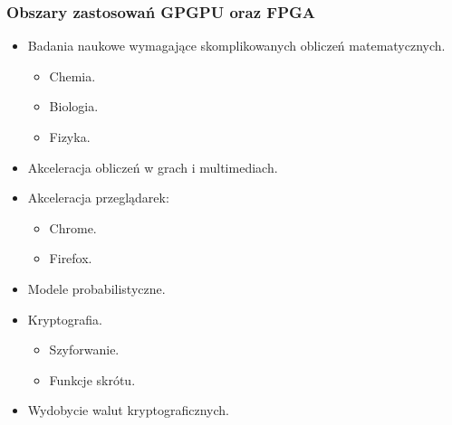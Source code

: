\documentclass[dvipsnames,table]{beamer}
\begin{document}

\begin{frame}
	\frametitle{Obszary zastosowań GPGPU oraz FPGA} 
\begin{itemize}
	\item Badania naukowe wymagające skomplikowanych obliczeń matematycznych.
	\begin{itemize}
		\item Chemia.
		\item Biologia.
		\item Fizyka.
	\end{itemize}
	\item Akceleracja obliczeń w grach i multimediach.
	\item Akceleracja przeglądarek:
	\begin{itemize}
		\item Chrome.
		\item Firefox.
	\end{itemize}
	\item Modele probabilistyczne.
	\item Kryptografia.
	\begin{itemize}
		\item Szyforwanie.
		\item Funkcje skrótu.
	\end{itemize}
	\item Wydobycie walut kryptograficznych.
\end{itemize}
\end{frame}
\end{document}
